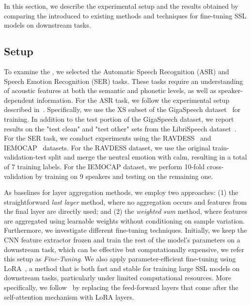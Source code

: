 In this section, we describe the experimental setup and the results obtained by comparing the introduced \varan to existing methods and techniques for fine-tuning SSL models on downstream tasks.




\subsection{Setup}

To examine the \varan, we selected the Automatic Speech Recognition (ASR) and Speech Emotion Recognition (SER) tasks. These tasks require an understanding of acoustic features at both the semantic and phonetic levels, as well as speaker-dependent information. For the ASR task, we follow the experimental setup described in~\cite{zaiem2024less}. Specifically, we use the XS subset of the GigaSpeech dataset~\cite{DBLP:journals/corr/abs-2106-06909} for training. In addition to the test portion of the GigaSpeech dataset, we report results on the "test clean" and "test other" sets from the LibriSpeech dataset~\cite{panayotov2015librispeech}. For the SER task, we conduct experiments using the RAVDESS~\cite{livingstone2018ryerson} and IEMOCAP~\cite{busso2008iemocap} datasets. For the RAVDESS dataset, we use the original train-validation-test split and merge the neutral emotion with calm, resulting in a total of 7 training labels. For the IEMOCAP dataset, we perform 10-fold cross-validation by training on 9 speakers and testing on the remaining one.

As baselines for layer aggregation methods, we employ two approaches: (1) the straightforward \textit{last layer} method, where no aggregation occurs and features from the final layer are directly used; and (2) the \textit{weighted sum} method, where features are aggregated using learnable weights without conditioning on sample variation. Furthermore, we investigate different fine-tuning techniques. Initially, we keep the CNN feature extractor frozen and train the rest of the model's parameters on a downstream task, which can be effective but computationally expensive, we refer this setup as \textit{Fine-Tuning}. We also apply parameter-efficient fine-tuning using LoRA~\cite{hu2021lora}, a method that is both fast and stable for training large SSL models on downstream tasks, particularly under limited computational resources. More specifically, we follow~\cite{zaiem2024less} by replacing the feed-forward layers that come after the self-attention mechanism with LoRA layers.

